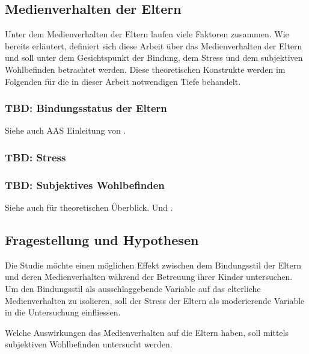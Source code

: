\subsection{Medienverhalten der Eltern}\label{sec:Medienverhalten}
Unter dem Medienverhalten der Eltern laufen viele Faktoren zusammen. Wie bereits erläutert, definiert sich diese Arbeit über das Medienverhalten der Eltern und soll unter dem Gesichtspunkt der Bindung, dem Stress und dem subjektiven Wohlbefinden betrachtet werden. Diese theoretischen Konstrukte werden im Folgenden für die in dieser Arbeit notwendigen Tiefe behandelt.

\subsubsection{TBD: Bindungsstatus der Eltern}\label{sec:Bindungsstatus}


Siehe auch AAS Einleitung von .

\subsubsection{TBD: Stress}\label{sec:Stress}

\subsubsection{TBD: Subjektives Wohlbefinden}\label{sec:Swb}
Siehe auch  für theoretischen Überblick. Und .






\subsection{Fragestellung und Hypothesen} \label{sec:Fragestellung}
Die Studie möchte einen möglichen Effekt zwischen dem Bindungsstil der Eltern und deren Medienverhalten während der Betreuung ihrer Kinder untersuchen. Um den Bindungsstil als ausschlaggebende Variable auf das elterliche Medienverhalten zu isolieren, soll der Stress der Eltern als moderierende Variable in die Untersuchung einfliessen.

Welche Auswirkungen das Medienverhalten auf die Eltern haben, soll mittels subjektiven Wohlbefinden  untersucht werden. 

